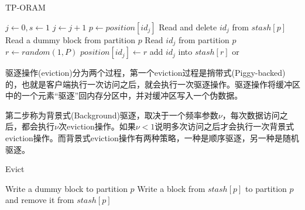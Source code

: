 \begin{algorithm}[H]
    \label{alg:TP}
    \caption{TP-ORAM}
    \begin{algorithmic}[1]
        \State $j \gets 0, s \gets 1$
            \State $j \gets j+1$
            \State $p \gets position[id_j]$
                \State Read and delete $id_j$ from $stash[p]$
                \State Read a dummy block from partition $p$
            \Else{}
                \State Read $id_j$ from partition $p$
            \EndIf
            \State $r \gets random(1,P)$
            \State $position[id_j] \gets r$
            \State add $id_j$ into $stash[r]$
            \State{} 
            \State{} or 
        \EndWhile
    \end{algorithmic}
\end{algorithm}
驱逐操作(eviction)分为两个过程，第一个eviction过程是捎带式(Piggy-backed)的，也就是客户端执行一次访问之后，就会执行一次驱逐操作。驱逐操作将缓冲区中的一个元素“驱逐”回内存分区中，并对缓冲区写入一个伪数据。\par
第二步称为背景式(Background)驱逐，取决于一个频率参数$\nu$，每次数据访问之后，都会执行$\nu$次eviction操作。如果$\nu<1$说明多次访问之后才会执行一次背景式eviction操作。而背景式eviction操作有两种策略，一种是顺序驱逐，另一种是随机驱逐。
\begin{algorithm}[H]
    \caption{Evict}
    \begin{algorithmic}[1]
                \State Write a dummy block to partition $p$
            \Else
                \State Write a block from $stash[p]$ to partition $p$ and remove it from $stash[p]$
            \EndIf
        \EndProcedure
    \end{algorithmic}
\end{algorithm}
